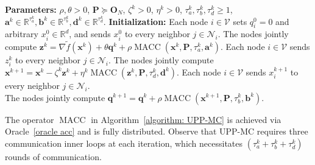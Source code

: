\documentclass[12pt,draftcls,onecolumn]{IEEEtran}
\renewcommand{\Re}{{\mathbb{R}}}
\begin{document}
\begin{algorithm}[h]
    \renewcommand{\thealgorithm}{1}
	\caption{UPP-MC}    
	\label{algorithm: UPP-MC} 
	\begin{algorithmic}[1]
	  \STATE \textbf{Parameters:} $\rho,\theta>0$, $\mathbf{P}\succeq\mathbf{O}_N$, $\zeta^k>0$, $\eta^k>0$, $\tau_a^k,\tau_b^k,\tau_d^k \geq 1$, $\mathbf{a}^k\in \mathbb{R}^{\tau_a^k}, \mathbf{b}^k\in \mathbb{R}^{\tau_b^k}, \mathbf{d}^k\in \mathbb{R}^{\tau_d^k}$.
		\STATE \textbf{Initialization:} Each node $i \in \mathcal{V}$ sets $q_i^0=0$ and arbitrary $x_i^0 \in \Re ^d$, and sends $x_i^0$ to every neighbor $j \in \mathcal{N}_i$.
			\STATE The nodes jointly compute $\mathbf{z}^{k}=\nabla \tilde{f}(\mathbf{x}^{k}) + \theta \mathbf{q}^{k}+\rho \operatorname{MACC}(\mathbf{x}^{k},\mathbf{P},\tau_a^{k},\mathbf{a}^{k})$.
			\STATE Each node $i \in \mathcal{V}$ sends $z_i^{k}$ to every neighbor $j \in \mathcal{N}_i$.
			\STATE The nodes jointly compute $\mathbf{x}^{k+1} = \mathbf{x}^k - \zeta^k\mathbf{z}^k + \eta^k \operatorname{MACC}(\mathbf{z}^k,\mathbf{P},\tau_d^k,\mathbf{d}^k)$. 
			\STATE Each node $i \in \mathcal{V}$ sends $x_i^{k+1}$ to every neighbor $j \in \mathcal{N}_i$. \\
			\STATE The nodes jointly compute $\mathbf{q}^{k+1}=\mathbf{q}^k+\rho\operatorname{MACC}({\mathbf{x}}^{k+1},\mathbf{P},\tau_b^k,\mathbf{b}^k)$.
		\ENDFOR
	\end{algorithmic}
\end{algorithm}

The operator $\operatorname{MACC}$ in Algorithm~\ref{algorithm: UPP-MC} is achieved via Oracle~\ref{oracle acc} and is fully distributed. Observe that UPP-MC requires three communication inner loops at each iteration, which necessitates $(\tau_{a}^k+\tau_b^k+\tau_d^k)$ rounds of communication. 

\end{document}
